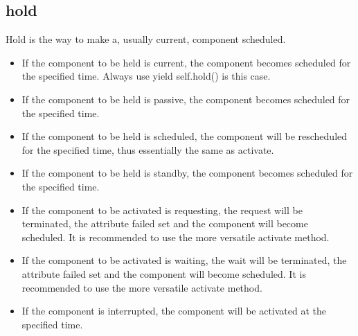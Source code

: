 \documentclass[letterpaper,10pt,english]{sphinxmanual}
\begin{document}
\subsection{hold}
\label{\detokenize{Component:hold}}
Hold is the way to make a, usually current, component scheduled.
\begin{itemize}
\item {} 
If the component to be held is current, the component becomes scheduled for the specified time. Always
use yield self.hold() is this case.

\item {} 
If the component to be held is passive, the component becomes scheduled for the specified time.

\item {} 
If the component to be held is scheduled, the component will be rescheduled for the specified time, thus
essentially the same as activate.

\item {} 
If the component to be held is standby, the component becomes scheduled for the specified time.

\item {} 
If the component to be activated is requesting, the request will be terminated, the attribute failed
set and the component will become scheduled. It is recommended to use the more versatile activate method.

\item {} 
If the component to be activated is waiting, the wait will be
terminated, the attribute failed set and the component will become scheduled. It is recommended to
use the more versatile activate method.

\item {} 
If the component is interrupted, the component will be activated at the specified time.

\end{itemize}
\end{document}
